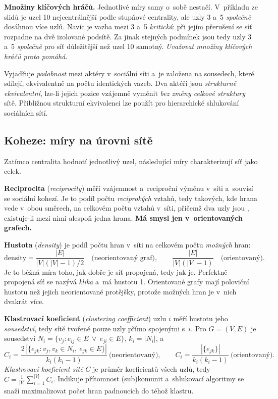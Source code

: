 \documentclass[11pt,a4paper]{article}
\theoremstyle{definition}
\begin{document}
\textbf{Množiny klíčových hráčů.} Jednotlivé míry samy o~sobě nestačí. V~příkladu ze slidů je
uzel 10 nejcentrálnější podle stupňové centrality, ale uzly 3 a~5 \emph{společně} dosáhnou
více uzlů. Navíc je vazba mezi 3 a~5 \emph{kritická}: při jejím přerušení se síť rozpadne na
dvě izolované podsítě. Za jinak stejných podmínek jsou tedy uzly 3 a~5 \emph{společně} pro
síť důležitější než uzel 10 samotný. \emph{Uvažovat množiny klíčových hráčů proto pomáhá.}

\begin{defbox}
Vyjadřuje \emph{podobnost} mezi aktéry v~sociální síti a~je založena na sousedech, které
sdílejí, ekvivalentně na počtu identických vazeb. Dva aktéři jsou \emph{strukturně
ekvivalentní}, lze-li jejich pozice vzájemně vyměnit \emph{bez změny celkové struktury}
sítě. Přibližnou strukturní ekvivalenci lze použít pro hierarchické shlukování sociálních
sítí.
\end{defbox}

\subsection{Koheze: míry na úrovni sítě}

Zatímco centralita hodnotí jednotlivý uzel, následující míry charakterizují síť jako celek.

\begin{defbox}
\textbf{Reciprocita} (\emph{reciprocity}) měří vzájemnost a~reciproční výměnu v~síti a~souvisí
se sociální kohezí. Je to podíl počtu \emph{reciprokých} vztahů, tedy takových, kde hrana
vede v~obou směrech, na celkovém počtu vztahů v~síti, přičemž dva uzly jsou ,
existuje-li mezi nimi alespoň jedna hrana. \textbf{Má smysl jen v~orientovaných grafech.}

\textbf{Hustota} (\emph{density}) je podíl počtu hran v~síti na celkovém počtu \emph{možných}
hran:
\[ \text{density}=\frac{|E|}{|V|(|V|-1)/2}\quad\text{(neorientovaný graf)},\qquad
   \frac{|E|}{|V|(|V|-1)}\quad\text{(orientovaný)}. \]
Je to běžná míra toho, jak dobře je síť propojená, tedy jak  je. Perfektně
propojená síť se nazývá \emph{klika} a~má hustotu 1. Orientované grafy mají poloviční hustotu
než jejich neorientované protějšky, protože možných hran je v~nich dvakrát více.

\textbf{Klastrovací koeficient} (\emph{clustering coefficient}) uzlu $i$ měří hustotu jeho
\emph{sousedství}, tedy sítě tvořené pouze uzly přímo spojenými s~$i$. Pro $G=(V,E)$ je
sousedství $N_i=\{v_j: e_{ij}\in E\ \vee\ e_{ji}\in E\}$, $k_i=|N_i|$, a
\[ C_i=\frac{2\,|\{e_{jk}: v_j,v_k\in N_i,\ e_{jk}\in E\}|}{k_i(k_i-1)}
   \ \text{(neorientovaný)},\qquad
   C_i=\frac{|\{e_{jk}\}|}{k_i(k_i-1)}\ \text{(orientovaný)}. \]
\emph{Klastrovací koeficient sítě} $C$ je průměr koeficientů všech uzlů, tedy
$C=\frac{1}{|V|}\sum_{i=1}^{|V|}C_i$. Indikuje přítomnost (sub)komunit a~shlukovací
algoritmy se snaží maximalizovat počet hran padnoucích do téhož klastru.
\end{defbox}
\end{document}
